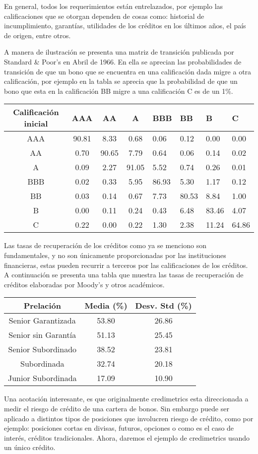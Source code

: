 \documentclass[
  12pt,
]{krantz}
\theoremstyle{definition}
\theoremstyle{definition}
\theoremstyle{definition}
\theoremstyle{remark}
\begin{document}
En general, todos los requerimientos están entrelazados, por ejemplo las calificaciones que se otorgan dependen de cosas como: historial de incumplimiento, garantías, utilidades de los créditos en los últimos años, el país de origen, entre otros.

A manera de ilustración se presenta una matriz de transición publicada por Standard \& Poor's en Abril de 1966. En ella se aprecian las probabilidades de transición de que un bono que se encuentra en una calificación dada migre a otra calificación, por ejemplo en la tabla se aprecia que la probabilidad de que un bono que esta en la calificación BB migre a una calificación C es de un 1\%.

\begin{longtable}[]{@{}ccccllll@{}}
\toprule
Calificación inicial & AAA & AA & A & BBB & BB & B & C\tabularnewline
\midrule
\endhead
AAA & 90.81 & 8.33 & 0.68 & 0.06 & 0.12 & 0.00 & 0.00\tabularnewline
AA & 0.70 & 90.65 & 7.79 & 0.64 & 0.06 & 0.14 & 0.02\tabularnewline
A & 0.09 & 2.27 & 91.05 & 5.52 & 0.74 & 0.26 & 0.01\tabularnewline
BBB & 0.02 & 0.33 & 5.95 & 86.93 & 5.30 & 1.17 & 0.12\tabularnewline
BB & 0.03 & 0.14 & 0.67 & 7.73 & 80.53 & 8.84 & 1.00\tabularnewline
B & 0.00 & 0.11 & 0.24 & 0.43 & 6.48 & 83.46 & 4.07\tabularnewline
C & 0.22 & 0.00 & 0.22 & 1.30 & 2.38 & 11.24 & 64.86\tabularnewline
\bottomrule
\end{longtable}

Las tasas de recuperación de los créditos como ya se menciono son fundamentales, y no son únicamente proporcionadas por las instituciones financieras, estas pueden recurrir a terceros por las calificaciones de los créditos. A continuación se presenta una tabla que muestra las tasas de recuperación de créditos elaboradas por Moody's y otros académicos.

\begin{longtable}[]{@{}ccc@{}}
\toprule
Prelación & Media (\%) & Desv. Std (\%)\tabularnewline
\midrule
\endhead
Senior Garantizada & 53.80 & 26.86\tabularnewline
Senior sin Garantía & 51.13 & 25.45\tabularnewline
Senior Subordinado & 38.52 & 23.81\tabularnewline
Subordinada & 32.74 & 20.18\tabularnewline
Junior Subordinada & 17.09 & 10.90\tabularnewline
\bottomrule
\end{longtable}

Una acotación interesante, es que originalmente credimetrics esta direccionada a medir el riesgo de crédito de una cartera de bonos. Sin embargo puede ser aplicado a distintos tipos de posiciones que involucren riesgo de crédito, como por ejemplo: posiciones cortas en divisas, futuros, opciones o como es el caso de interés, créditos tradicionales. Ahora, daremos el ejemplo de credimetrics usando un único crédito.
\end{document}
